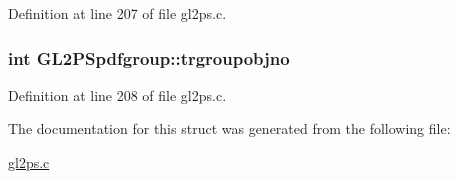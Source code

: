 Definition at line 207 of file gl2ps.\+c.

\hypertarget{struct_g_l2_p_spdfgroup_a26d86e3c60589a992cb0208f89951c52}{}
\subsubsection[{trgroupobjno}]{\setlength{\rightskip}{0pt plus 5cm}int G\+L2\+P\+Spdfgroup\+::trgroupobjno}\label{struct_g_l2_p_spdfgroup_a26d86e3c60589a992cb0208f89951c52}


Definition at line 208 of file gl2ps.\+c.



The documentation for this struct was generated from the following file\+:\begin{DoxyCompactItemize}
\item 
\hyperlink{gl2ps_8c}{gl2ps.\+c}\end{DoxyCompactItemize}

